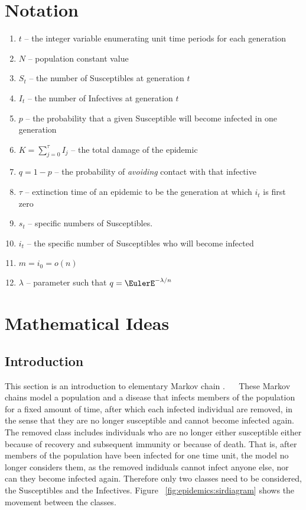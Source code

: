\documentclass[12pt]{article}
\begin{document}
\section*{Notation}
\begin{enumerate}
    \item
        \( t \) -- the integer variable enumerating unit time periods
        for each generation
    \item
        \( N \) -- population constant value
    \item
        \( S_t \) -- the number of Susceptibles at generation \( t \)
    \item
        \( I_t \) -- the number of Infectives at generation \( t \)
    \item
        \( p \) -- the probability that a given Susceptible will become
        infected in one generation
    \item
        \( K=\sum_{j = 0}^{\tau} I_j \) -- the total damage of the
        epidemic
    \item
        \( q = 1 - p \) -- the probability of \emph{avoiding} contact
        with that infective
    \item
        \( \tau \) -- extinction time of an epidemic to be the
        generation at which \( i_t \) is first zero
    \item
        \( s_t \) -- specific numbers of Susceptibles.
    \item
        \( i_{t} \) -- the specific number of Susceptibles who will
        become infected
    \item
        \( m = i_0 = o(n) \)
    \item
        \( \lambda \) -- parameter such that \( q = \EulerE^{-\lambda/n}
        \)
\end{enumerate}
\section*{Mathematical Ideas}

\subsection*{Introduction}

This section is an introduction to elementary Markov chain .~%
%
~%
These Markov chains model a population and a disease that infects
members of the population for a fixed amount of time, after which each
infected individual are removed, in the sense that they are no longer
susceptible and cannot become infected again.  The removed class
includes individuals who are no longer either susceptible either because
of recovery and subsequent immunity or because of death.  That is, after
members of the population have been infected for one time unit, the
model no longer considers them, as the removed indiduals cannot infect
anyone else, nor can they become infected again.  Therefore only two
classes need to be considered, the Susceptibles and the Infectives.
Figure~%
\ref{fig:epidemics:sirdiagram} shows the movement between the classes.
\end{document}
